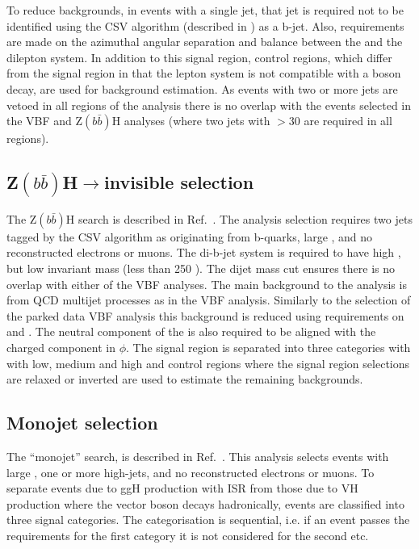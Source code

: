 To reduce backgrounds, in events with a single jet, that jet is required not to be identified using the \ac{CSV} algorithm (described in ) as a b-jet. Also, requirements are made on the azimuthal angular separation and \pt balance between the \MET and the dilepton system. In addition to this signal region, control regions, which differ from the signal region in that the lepton system is not compatible with a \PZ boson decay, are used for background estimation. As events with two or more jets are vetoed in all regions of the analysis there is no overlap with the events selected in the \ac{VBF} and Z$(b\bar{b})$H analyses (where two jets with \pt$>30$ \GeV are required in all regions). 

\subsection{Z$(b\bar{b})$H$\rightarrow$invisible selection}
\label{sec:zbbh}
The Z$(b\bar{b})$H search is described in Ref.~\cite{CMS-PAS-HIG-13-028}. The analysis selection requires two jets tagged by the \ac{CSV} algorithm as originating from b-quarks, large \MET, and no reconstructed electrons or muons. The di-b-jet system is required to have high \pt, but low invariant mass (less than 250 \GeV). The dijet mass cut ensures there is no overlap with either of the \ac{VBF} analyses. The main background to the analysis is from \ac{QCD} multijet processes as in the \ac{VBF} analysis. Similarly to the selection of the parked data \ac{VBF} analysis this background is reduced using requirements on \jetmetdphi and \METsig. The neutral component of the \MET is also required to be aligned with the charged component in $\phi$. The signal region is separated into three categories with with low, medium and high \MET and control regions where the signal region selections are relaxed or inverted are used to estimate the remaining backgrounds.

\subsection{Monojet selection}
\label{sec:monojet}
The ``monojet'' search, is described in Ref.~\cite{CMS-PAS-EXO-12-055}. This analysis selects events with large \MET, one or more high-\pt jets, and no reconstructed electrons or muons. To separate events due to \ac{ggH} production with \ac{ISR} from those due to \ac{VH} production where the vector boson decays hadronically, events are classified into three signal categories. The categorisation is sequential, i.e. if an event passes the requirements for the first category it is not considered for the second etc. 

